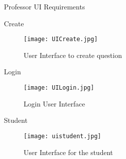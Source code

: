 \documentclass{article}
\begin{document}
\begin{section}{Professor UI Requirements}
\begin{subsection}{Create}
\begin{figure}[h!]
        \centerline{\texttt{[image: UICreate.jpg]}}
        \caption{User Interface to create question}
\end{figure}
\end{subsection}
\newpage
\begin{subsection}{Login}
\begin{figure}[h!]
        \centerline{\texttt{[image: UILogin.jpg]}}
        \caption{Login User Interface}
\end{figure}
\end{subsection}
\newpage
\begin{subsection}{Student}
\begin{figure}[h!]
        \centerline{\texttt{[image: uistudent.jpg]}}
        \caption{User Interface for the student}
\end{figure}
\end{subsection}


\end{section}
\end{document}

